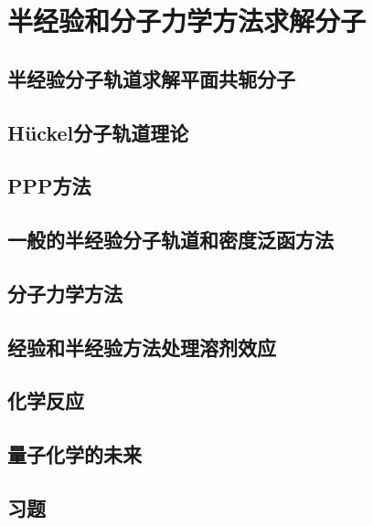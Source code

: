\chapter{半经验和分子力学方法求解分子}
\section{半经验分子轨道求解平面共轭分子}

\section{Hückel分子轨道理论}

\section{PPP方法}

\section{一般的半经验分子轨道和密度泛函方法}

\section{分子力学方法}

\section{经验和半经验方法处理溶剂效应}

\section{化学反应}

\section{量子化学的未来}

\section*{习题}


